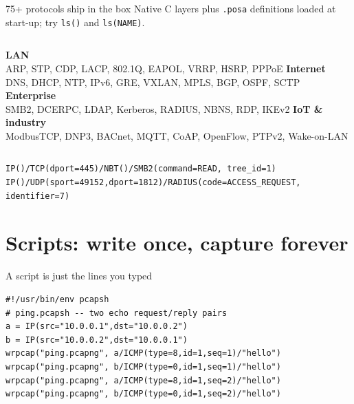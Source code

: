 \documentclass[aspectratio=169,11pt]{beamer}
\newcommand{\cmd}[1]{\texttt{\textcolor{wire}{#1}}}
\begin{document}
\begin{frame}[fragile]{75+ protocols ship in the box}
Native C layers plus \texttt{.posa} definitions loaded at start-up; try \cmd{ls()} and \cmd{ls(NAME)}.

\medskip
\footnotesize
\begin{columns}[T]
\textbf{\textcolor{wire}{LAN}}\\ ARP, STP, CDP, LACP, 802.1Q, EAPOL, VRRP, HSRP, PPPoE
\textbf{\textcolor{wire}{Internet}}\\ DNS, DHCP, NTP, IPv6, GRE, VXLAN, MPLS, BGP, OSPF, SCTP
\textbf{\textcolor{wire}{Enterprise}}\\ SMB2, DCERPC, LDAP, Kerberos, RADIUS, NBNS, RDP, IKEv2
\textbf{\textcolor{wire}{IoT \& industry}}\\ ModbusTCP, DNP3, BACnet, MQTT, CoAP, OpenFlow, PTPv2, Wake-on-LAN
\end{columns}
\normalsize
\bigskip
\begin{lstlisting}
IP()/TCP(dport=445)/NBT()/SMB2(command=READ, tree_id=1)
IP()/UDP(sport=49152,dport=1812)/RADIUS(code=ACCESS_REQUEST, identifier=7)
\end{lstlisting}
\end{frame}

\section{Scripts: write once, capture forever}

\begin{frame}[fragile]{A script is just the lines you typed}
\begin{lstlisting}
#!/usr/bin/env pcapsh
# ping.pcapsh -- two echo request/reply pairs
a = IP(src="10.0.0.1",dst="10.0.0.2")
b = IP(src="10.0.0.2",dst="10.0.0.1")
wrpcap("ping.pcapng", a/ICMP(type=8,id=1,seq=1)/"hello")
wrpcap("ping.pcapng", b/ICMP(type=0,id=1,seq=1)/"hello")
wrpcap("ping.pcapng", a/ICMP(type=8,id=1,seq=2)/"hello")
wrpcap("ping.pcapng", b/ICMP(type=0,id=1,seq=2)/"hello")
\end{lstlisting}
\end{frame}
\end{document}
